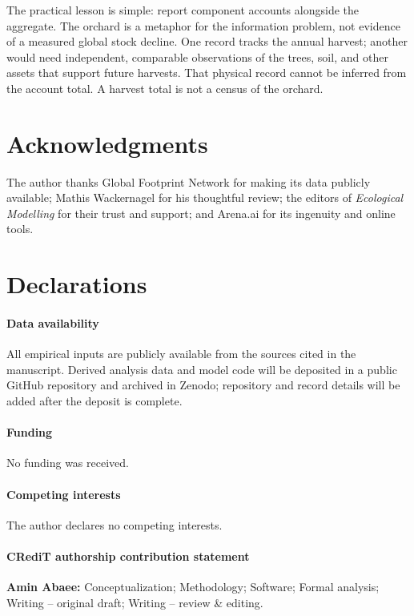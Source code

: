 \documentclass[preprint,12pt,authoryear]{elsarticle}
\begin{document}
The practical lesson is simple: report component accounts alongside the aggregate. The orchard is a metaphor for the information problem, not evidence of a measured global stock decline. One record tracks the annual harvest; another would need independent, comparable observations of the trees, soil, and other assets that support future harvests. That physical record cannot be inferred from the account total. A harvest total is not a census of the orchard.

\section*{Acknowledgments}

The author thanks Global Footprint Network for making its data publicly available; Mathis Wackernagel for his thoughtful review; the editors of \emph{Ecological Modelling} for their trust and support; and Arena.ai for its ingenuity and online tools.

\section*{Declarations}

\paragraph{Data availability} All empirical inputs are publicly available from the sources cited in the manuscript. Derived analysis data and model code will be deposited in a public GitHub repository and archived in Zenodo; repository and record details will be added after the deposit is complete.

\paragraph{Funding} No funding was received.

\paragraph{Competing interests} The author declares no competing interests.

\paragraph{CRediT authorship contribution statement} \textbf{Amin Abaee:} Conceptualization; Methodology; Software; Formal analysis; Writing -- original draft; Writing -- review \& editing.
\end{document}

